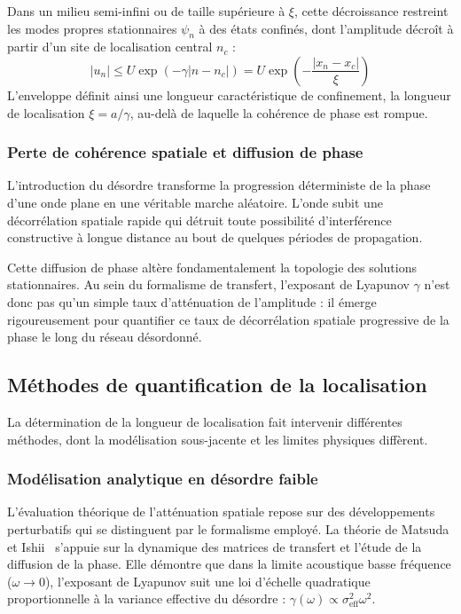 Dans un milieu semi-infini ou de taille supérieure à $\xi$, cette décroissance restreint les modes propres stationnaires $\psi_n$ à des états confinés, dont l'amplitude décroît à partir d'un site de localisation central $n_c$ :
\begin{equation}
    |u_n| \leq U \exp\left(-\gamma |n - n_c|\right) = U \exp\left(-\frac{|x_n - x_c|}{\xi}\right)
\end{equation}
L'enveloppe définit ainsi une longueur caractéristique de confinement, la longueur de localisation $\xi = a/\gamma$, au-delà de laquelle la cohérence de phase est rompue.

\subsubsection{Perte de cohérence spatiale et diffusion de phase}
L'introduction du désordre transforme la progression déterministe de la phase d'une onde plane en une véritable marche aléatoire. L'onde subit une décorrélation spatiale rapide qui détruit toute possibilité d'interférence constructive à longue distance au bout de quelques périodes de propagation. 

Cette diffusion de phase altère fondamentalement la topologie des solutions stationnaires. Au sein du formalisme de transfert, l'exposant de Lyapunov $\gamma$ n'est donc pas qu'un simple taux d'atténuation de l'amplitude : il émerge rigoureusement pour quantifier ce taux de décorrélation spatiale progressive de la phase le long du réseau désordonné.

\subsection{Méthodes de quantification de la localisation}
La détermination de la longueur de localisation fait intervenir différentes méthodes, dont la modélisation sous-jacente et les limites physiques diffèrent.

\subsubsection{Modélisation analytique en désordre faible}
L'évaluation théorique de l'atténuation spatiale repose sur des développements perturbatifs qui se distinguent par le formalisme employé. La théorie de Matsuda et Ishii~\cite{matsuda1970localization} s'appuie sur la dynamique des matrices de transfert et l'étude de la diffusion de la phase. Elle démontre que dans la limite acoustique basse fréquence ($\omega \to 0$), l'exposant de Lyapunov suit une loi d'échelle quadratique proportionnelle à la variance effective du désordre : $\gamma(\omega) \propto \sigma_{\text{eff}}^2 \omega^2$.

